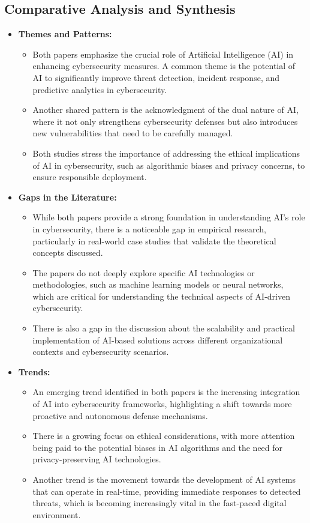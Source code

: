 \documentclass{article}  %
\begin{document}
\subsection{Comparative Analysis and Synthesis}
\begin{itemize}
    \item \textbf{Themes and Patterns:} 
    \begin{itemize}
        \item Both papers emphasize the crucial role of Artificial Intelligence (AI) in enhancing cybersecurity measures. A common theme is the potential of AI to significantly improve threat detection, incident response, and predictive analytics in cybersecurity.
        \item Another shared pattern is the acknowledgment of the dual nature of AI, where it not only strengthens cybersecurity defenses but also introduces new vulnerabilities that need to be carefully managed.
        \item Both studies stress the importance of addressing the ethical implications of AI in cybersecurity, such as algorithmic biases and privacy concerns, to ensure responsible deployment.
    \end{itemize}
    
    \item \textbf{Gaps in the Literature:}
    \begin{itemize}
        \item While both papers provide a strong foundation in understanding AI’s role in cybersecurity, there is a noticeable gap in empirical research, particularly in real-world case studies that validate the theoretical concepts discussed.
        \item The papers do not deeply explore specific AI technologies or methodologies, such as machine learning models or neural networks, which are critical for understanding the technical aspects of AI-driven cybersecurity.
        \item There is also a gap in the discussion about the scalability and practical implementation of AI-based solutions across different organizational contexts and cybersecurity scenarios.
    \end{itemize}
    
    \item \textbf{Trends:}
    \begin{itemize}
        \item An emerging trend identified in both papers is the increasing integration of AI into cybersecurity frameworks, highlighting a shift towards more proactive and autonomous defense mechanisms.
        \item There is a growing focus on ethical considerations, with more attention being paid to the potential biases in AI algorithms and the need for privacy-preserving AI technologies.
        \item Another trend is the movement towards the development of AI systems that can operate in real-time, providing immediate responses to detected threats, which is becoming increasingly vital in the fast-paced digital environment.
    \end{itemize}
    

\end{itemize}
\end{document}
